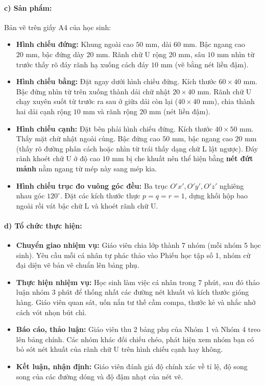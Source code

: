 \documentclass[12pt, a4paper]{article}
\begin{document}
\paragraph{c) Sản phẩm:} Bản vẽ trên giấy A4 của học sinh:
\begin{itemize}[leftmargin=0.8cm]
    \item \textbf{Hình chiếu đứng:} Khung ngoài cao $50\text{ mm}$, dài $60\text{ mm}$. Bậc ngang cao $20\text{ mm}$, bậc đứng dày $20\text{ mm}$. Rãnh chữ U rộng $20\text{ mm}$, sâu $10\text{ mm}$ nhìn từ trước thấy rõ đáy rãnh hạ xuống cách đáy $10\text{ mm}$ (vẽ bằng nét liền đậm).
    \item \textbf{Hình chiếu bằng:} Đặt ngay dưới hình chiếu đứng. Kích thước $60 \times 40\text{ mm}$. Bậc đứng nhìn từ trên xuống thành dải chữ nhật $20 \times 40\text{ mm}$. Rãnh chữ U chạy xuyên suốt từ trước ra sau ở giữa dải còn lại ($40 \times 40\text{ mm}$), chia thành hai dải cạnh rộng $10\text{ mm}$ và rãnh rộng $20\text{ mm}$ (nét liền đậm).
    \item \textbf{Hình chiếu cạnh:} Đặt bên phải hình chiếu đứng. Kích thước $40 \times 50\text{ mm}$. Thấy mặt chữ nhật ngoài cùng. Bậc đứng cao $50\text{ mm}$, bậc ngang cao $20\text{ mm}$ (thấy rõ đường phân cách hoặc nhìn từ trái thấy dạng chữ L lật ngược). Đáy rãnh khoét chữ U ở độ cao $10\text{ mm}$ bị che khuất nên thể hiện bằng \textbf{nét đứt mảnh} nằm ngang từ mép này sang mép kia.
    \item \textbf{Hình chiếu trục đo vuông góc đều:} Ba trục $O'x', O'y', O'z'$ nghiêng nhau góc $120^\circ$. Đặt các kích thước thực $p=q=r=1$, dựng khối hộp bao ngoài rồi vát bậc chữ L và khoét rãnh chữ U.
\end{itemize}

\paragraph{d) Tổ chức thực hiện:}
\begin{itemize}[leftmargin=0.8cm]
    \item \textbf{Chuyển giao nhiệm vụ:} Giáo viên chia lớp thành 7 nhóm (mỗi nhóm 5 học sinh). Yêu cầu mỗi cá nhân tự phác thảo vào Phiếu học tập số 1, nhóm cử đại diện vẽ bản vẽ chuẩn lên bảng phụ.
    \item \textbf{Thực hiện nhiệm vụ:} Học sinh làm việc cá nhân trong 7 phút, sau đó thảo luận nhóm 3 phút để thống nhất các đường nét khuất và kích thước gióng hàng. Giáo viên quan sát, uốn nắn tư thế cầm compa, thước kẻ và nhắc nhở cách vót nhọn bút chì.
    \item \textbf{Báo cáo, thảo luận:} Giáo viên thu 2 bảng phụ của Nhóm 1 và Nhóm 4 treo lên bảng chính. Các nhóm khác đối chiếu chéo, phát hiện xem nhóm bạn có bỏ sót nét khuất của rãnh chữ U trên hình chiếu cạnh hay không.
    \item \textbf{Kết luận, nhận định:} Giáo viên đánh giá độ chính xác về tỉ lệ, độ song song của các đường dóng và độ đậm nhạt của nét vẽ.
\end{itemize}
\end{document}
